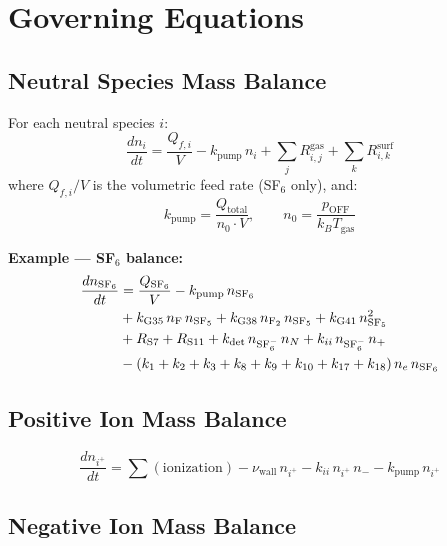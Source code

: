 \documentclass[11pt,a4paper]{article}
\begin{document}
\section{Governing Equations}

\subsection{Neutral Species Mass Balance}

For each neutral species $i$:
\begin{equation}\label{eq:neutral_balance}
  \boxed{\frac{dn_i}{dt} = \frac{Q_{f,i}}{V} - k_\text{pump}\,n_i + \sum_j R^\text{gas}_{i,j} + \sum_k R^\text{surf}_{i,k}}
\end{equation}
where $Q_{f,i}/V$ is the volumetric feed rate (SF$_6$ only), and:
\begin{equation}
  k_\text{pump} = \frac{Q_\text{total}}{n_0 \cdot V}, \qquad n_0 = \frac{p_\text{OFF}}{k_B T_\text{gas}}
\end{equation}

\textbf{Example --- SF$_6$ balance:}
\begin{align}
  \frac{dn_{\text{SF}_6}}{dt} &= \frac{Q_{\text{SF}_6}}{V} - k_\text{pump}\,n_{\text{SF}_6} \notag\\
  &+ k_\text{G35}\,n_\text{F}\,n_{\text{SF}_5} + k_\text{G38}\,n_{\text{F}_2}\,n_{\text{SF}_5} + k_\text{G41}\,n_{\text{SF}_5}^2 \notag\\
  &+ R_\text{S7} + R_\text{S11} + k_\text{det}\,n_{\text{SF}_6^-}\,n_N + k_{ii}\,n_{\text{SF}_6^-}\,n_+ \notag\\
  &- (k_1 + k_2 + k_3 + k_8 + k_9 + k_{10} + k_{17} + k_{18})\,n_e\,n_{\text{SF}_6}
\end{align}

\subsection{Positive Ion Mass Balance}

\begin{equation}
  \frac{dn_{i^+}}{dt} = \sum(\text{ionization}) - \nu_\text{wall}\,n_{i^+} - k_{ii}\,n_{i^+}\,n_- - k_\text{pump}\,n_{i^+}
\end{equation}

\subsection{Negative Ion Mass Balance}
\end{document}
